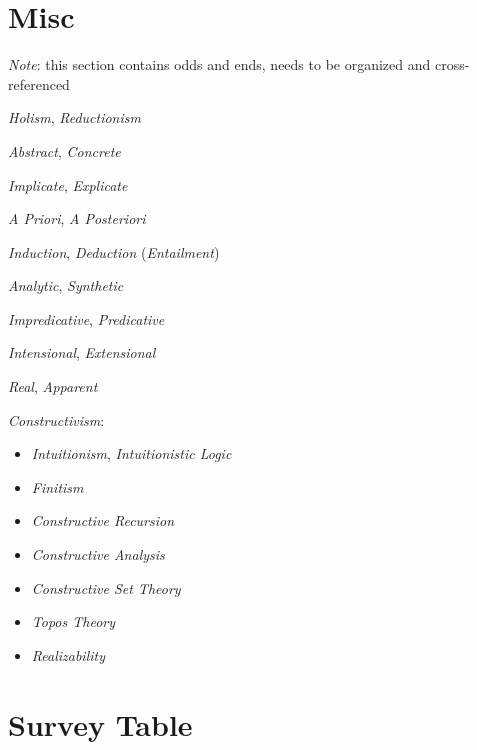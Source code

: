 \section{Misc}

\emph{Note}: this section contains odds and ends, needs to be
organized and cross-referenced

\emph{Holism}, \emph{Reductionism}

\emph{Abstract}, \emph{Concrete}

\emph{Implicate}, \emph{Explicate}

\emph{A Priori}, \emph{A Posteriori}

\emph{Induction}, \emph{Deduction} (\emph{Entailment})

\emph{Analytic}, \emph{Synthetic}

\emph{Impredicative}, \emph{Predicative}

\emph{Intensional}, \emph{Extensional}

\emph{Real}, \emph{Apparent}

\emph{Constructivism}:
\begin{itemize}
    \item \emph{Intuitionism}, \emph{Intuitionistic Logic}
    \item \emph{Finitism}
    \item \emph{Constructive Recursion}
    \item \emph{Constructive Analysis}
    \item \emph{Constructive Set Theory}
    \item \emph{Topos Theory}
    \item \emph{Realizability}
\end{itemize}



\section{Survey Table}

